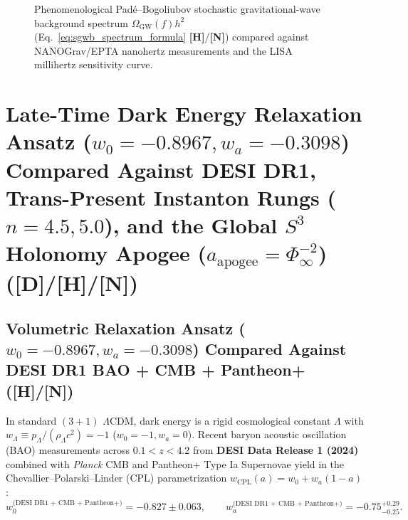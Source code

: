 \documentclass[11pt,a4paper]{article}
\newcommand{\catD}{\textbf{\textcolor{blue!75!black}{[D]}}}
\newcommand{\catH}{\textbf{\textcolor{orange!85!black}{[H]}}}
\newcommand{\catN}{\textbf{\textcolor{teal!75!black}{[N]}}}
\theoremstyle{plain}
\theoremstyle{definition}
\theoremstyle{remark}
\numberwithin{equation}{section}
\begin{document}
\begin{figure}[H]
\caption{Phenomenological Pad\'e--Bogoliubov stochastic gravitational-wave background spectrum $\Omega_{\text{GW}}(f) h^2$ (Eq.~\ref{eq:sgwb_spectrum_formula} \catH/\catN) compared against NANOGrav/EPTA nanohertz measurements \cite{nanograv2023} and the LISA millihertz sensitivity curve.}
\label{fig:sgwb_nanograv_lisa}
\end{figure}

\section{\texorpdfstring{Late-Time Dark Energy Relaxation Ansatz ($w_0 = -0.8967, w_a = -0.3098$) Compared Against DESI DR1, Trans-Present Instanton Rungs ($n = 4.5, 5.0$), and the Global $S^3$ Holonomy Apogee ($a_{\text{apogee}} = \Phi_{\infty}^{-2}$) (\catD/\catH/\catN)}{Late-Time Dark Energy Relaxation Ansatz Compared Against DESI DR1, Trans-Present Instanton Rungs, and the Global S^3 Holonomy Apogee}}

\subsection{\texorpdfstring{Volumetric Relaxation Ansatz ($w_0 = -0.8967, w_a = -0.3098$) Compared Against DESI DR1 BAO + CMB + Pantheon+ (\catH/\catN)}{Volumetric Relaxation Ansatz (w_0 = -0.8967, w_a = -0.3098) Compared Against DESI DR1 BAO + CMB + Pantheon+ ([H]/[N])}}

In standard $(3+1)$ $\Lambda\text{CDM}$, dark energy is a rigid cosmological constant $\Lambda$ with $w_{\Lambda} \equiv p_\Lambda / (\rho_\Lambda c^2) = -1$ ($w_0 = -1, w_a = 0$). Recent baryon acoustic oscillation (BAO) measurements across $0.1 < z < 4.2$ from \textbf{DESI Data Release 1 (2024)} combined with \textit{Planck} CMB and Pantheon+ Type Ia Supernovae \cite{desi2024_vi} yield in the Chevallier--Polarski--Linder (CPL) parametrization $w_{\text{CPL}}(a) = w_0 + w_a (1 - a)$ \cite{chevallier2001,linder2003}:
\begin{equation}
  w_0^{\text{(DESI DR1 + CMB + Pantheon+)}} = -0.827 \pm 0.063, \qquad w_a^{\text{(DESI DR1 + CMB + Pantheon+)}} = -0.75^{+0.29}_{-0.25}.
  \label{eq:desi_dr1_official_values}
\end{equation}
\end{document}
